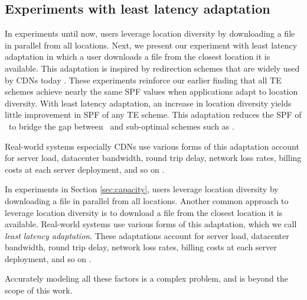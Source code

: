 \subsection{Experiments with least latency adaptation}
\label{sec:leastlatency}


In experiments until now, users leverage location diversity by downloading a file in parallel from all locations. Next, we present our experiment with least latency adaptation in which a user downloads a file from the closest location it is available. 
This adaptation is inspired by redirection schemes that are widely used by CDNs today \cite{Akamai2002,donar}.
These experiments reinforce our earlier finding that all TE schemes achieve nearly the same SPF values when applications adapt to location diversity.
With least latency adaptation, an increase in location diversity yields little improvement in SPF of any TE scheme.
This adaptation reduces the SPF of \opt\ to bridge the gap between \opt\ and sub-optimal schemes such as \optwt.




\eat
{
Real-world systems especially CDNs \cite{Akamai2002,donar} use various forms of this adaptation account for  server load, datacenter bandwidth, round trip delay, network loss rates, billing costs at each server deployment, and so on \cite{Akamai2002,donar}.


In experiments in Section \ref{sec:capacity}, users leverage location diversity by downloading a file in parallel from all locations.
Another common approach to leverage location diversity is to download a file from the closest location it is available.
Real-world systems use various forms of this adaptation, which we call \emph{least latency adaptation}. 
These adaptations account for  server load, datacenter bandwidth, round trip delay, network loss rates, billing costs at each server deployment, and so on \cite{Akamai2002,donar}.


Accurately modeling all these factors is a complex problem, and is beyond the scope of this work.
}



